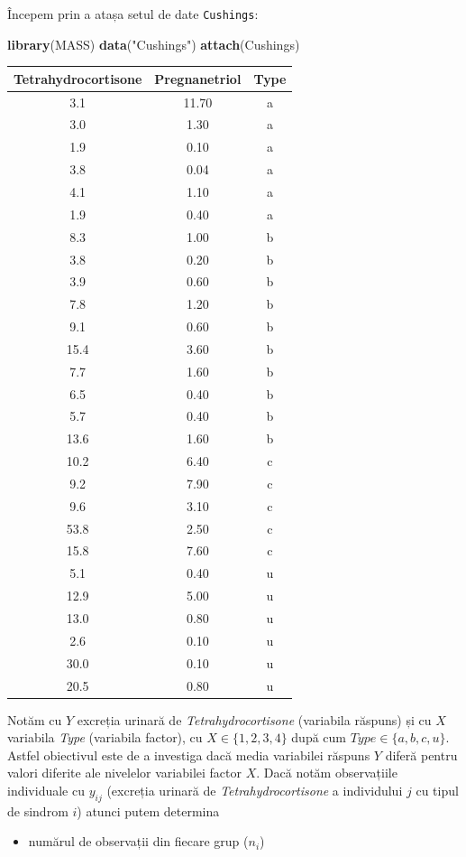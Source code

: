 \documentclass[]{article}
\newenvironment{Shaded}{\begin{snugshade}}{\end{snugshade}}
\newcommand{\KeywordTok}[1]{\textcolor[rgb]{0.13,0.29,0.53}{\textbf{{#1}}}}
\newcommand{\StringTok}[1]{\textcolor[rgb]{0.31,0.60,0.02}{{#1}}}
\newcommand{\CommentTok}[1]{\textcolor[rgb]{0.56,0.35,0.01}{\textit{{#1}}}}
\newcommand{\NormalTok}[1]{{#1}}
\providecommand{\tightlist}{%
  \setlength{\itemsep}{0pt}\setlength{\parskip}{0pt}}
\begin{document}
Începem prin a atașa setul de date \texttt{Cushings}:

\begin{Shaded}
\begin{Highlighting}[]
\KeywordTok{library}\NormalTok{(MASS)}
\KeywordTok{data}\NormalTok{(}\StringTok{"Cushings"}\NormalTok{)}
\KeywordTok{attach}\NormalTok{(Cushings)}
\end{Highlighting}
\end{Shaded}

\begin{longtable}[]{@{}ccc@{}}
\toprule
Tetrahydrocortisone & Pregnanetriol & Type\tabularnewline
\midrule
\endhead
3.1 & 11.70 & a\tabularnewline
3.0 & 1.30 & a\tabularnewline
1.9 & 0.10 & a\tabularnewline
3.8 & 0.04 & a\tabularnewline
4.1 & 1.10 & a\tabularnewline
1.9 & 0.40 & a\tabularnewline
8.3 & 1.00 & b\tabularnewline
3.8 & 0.20 & b\tabularnewline
3.9 & 0.60 & b\tabularnewline
7.8 & 1.20 & b\tabularnewline
9.1 & 0.60 & b\tabularnewline
15.4 & 3.60 & b\tabularnewline
7.7 & 1.60 & b\tabularnewline
6.5 & 0.40 & b\tabularnewline
5.7 & 0.40 & b\tabularnewline
13.6 & 1.60 & b\tabularnewline
10.2 & 6.40 & c\tabularnewline
9.2 & 7.90 & c\tabularnewline
9.6 & 3.10 & c\tabularnewline
53.8 & 2.50 & c\tabularnewline
15.8 & 7.60 & c\tabularnewline
5.1 & 0.40 & u\tabularnewline
12.9 & 5.00 & u\tabularnewline
13.0 & 0.80 & u\tabularnewline
2.6 & 0.10 & u\tabularnewline
30.0 & 0.10 & u\tabularnewline
20.5 & 0.80 & u\tabularnewline
\bottomrule
\end{longtable}

Notăm cu \(Y\) excreția urinară de \emph{Tetrahydrocortisone} (variabila
răspuns) și cu \(X\) variabila \emph{Type} (variabila factor), cu
\(X\in\{1,2,3,4\}\) după cum \(Type\in\{a,b,c,u\}\). Astfel obiectivul
este de a investiga dacă media variabilei răspuns \(Y\) diferă pentru
valori diferite ale nivelelor variabilei factor \(X\). Dacă notăm
observațiile individuale cu \(y_{ij}\) (excreția urinară de
\emph{Tetrahydrocortisone} a individului \(j\) cu tipul de sindrom
\(i\)) atunci putem determina

\begin{itemize}
\tightlist
\item
  numărul de observații din fiecare grup (\(n_i\))
\end{itemize}

\begin{Shaded}
\end{Shaded}
\end{document}
